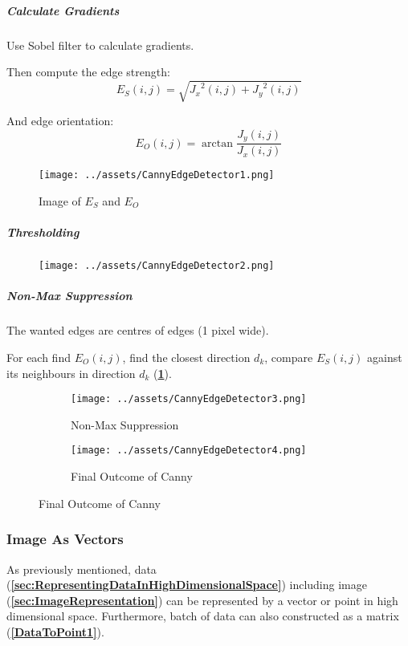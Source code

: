 \documentclass[a4paper, openany]{book}
\begin{document}
\subparagraph{Calculate Gradients}

Use Sobel filter to calculate gradients.

Then compute the edge strength:
$$E_S(i, j) = \sqrt{{J_x}^2 (i, j) + {J_y}^2 (i, j)}$$

And edge orientation:
$$E_O(i, j) = \arctan \frac{J_y (i, j)}{J_x (i, j)}$$

\begin{figure}
  \centering
  \texttt{[image: ../assets/CannyEdgeDetector1.png]}
  \caption{Image of $E_S$ and $E_O$}
\end{figure}

\subparagraph{Thresholding}

\begin{figure}
  \centering
  \texttt{[image: ../assets/CannyEdgeDetector2.png]}
\end{figure}

\subparagraph{Non-Max Suppression}

The wanted edges are centres of edges (1 pixel wide).

For each find $E_O(i, j)$, find the closest direction $d_k$, compare $E_S(i, j)$ against its neighbours in direction $d_k$ (\textbf{\cref{fig:CannyEdgeDetector3}}).

\begin{figure}
  \centering
  \begin{subfigure}{0.4\textwidth}
    \centering
    \texttt{[image: ../assets/CannyEdgeDetector3.png]}
    \caption{Non-Max Suppression}
    \label{fig:CannyEdgeDetector3}
  \end{subfigure}
  \begin{subfigure}{0.4\textwidth}
    \centering
    \texttt{[image: ../assets/CannyEdgeDetector4.png]}
    \caption{Final Outcome of Canny}
  \end{subfigure}
\end{figure}

\subsubsection{Image As Vectors}\label{sec:ImageAsVectors}

As previously mentioned, data (\textbf{\cref{sec:RepresentingDataInHighDimensionalSpace}}) including image (\textbf{\cref{sec:ImageRepresentation}}) can be represented by a vector or point in high dimensional space. Furthermore, batch of data can also constructed as a matrix (\textbf{\cref{DataToPoint1}}).
\end{document}
